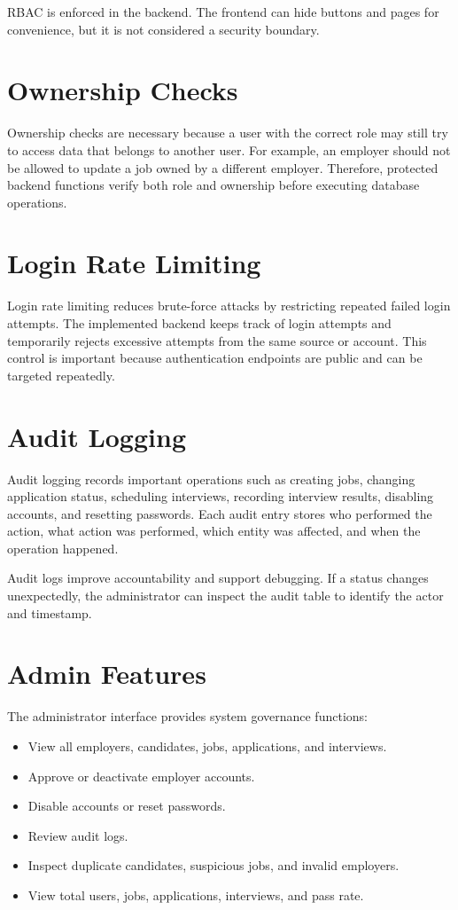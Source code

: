 \documentclass[11pt,a4paper]{report}
\begin{document}
RBAC is enforced in the backend. The frontend can hide buttons and pages for convenience, but it is not considered a security boundary.

\section{Ownership Checks}

Ownership checks are necessary because a user with the correct role may still try to access data that belongs to another user. For example, an employer should not be allowed to update a job owned by a different employer. Therefore, protected backend functions verify both role and ownership before executing database operations.

\section{Login Rate Limiting}

Login rate limiting reduces brute-force attacks by restricting repeated failed login attempts. The implemented backend keeps track of login attempts and temporarily rejects excessive attempts from the same source or account. This control is important because authentication endpoints are public and can be targeted repeatedly.

\section{Audit Logging}

Audit logging records important operations such as creating jobs, changing application status, scheduling interviews, recording interview results, disabling accounts, and resetting passwords. Each audit entry stores who performed the action, what action was performed, which entity was affected, and when the operation happened.

Audit logs improve accountability and support debugging. If a status changes unexpectedly, the administrator can inspect the audit table to identify the actor and timestamp.

\section{Admin Features}

The administrator interface provides system governance functions:

\begin{itemize}[leftmargin=1.5cm]
  \item View all employers, candidates, jobs, applications, and interviews.
  \item Approve or deactivate employer accounts.
  \item Disable accounts or reset passwords.
  \item Review audit logs.
  \item Inspect duplicate candidates, suspicious jobs, and invalid employers.
  \item View total users, jobs, applications, interviews, and pass rate.
\end{itemize}
\end{document}
